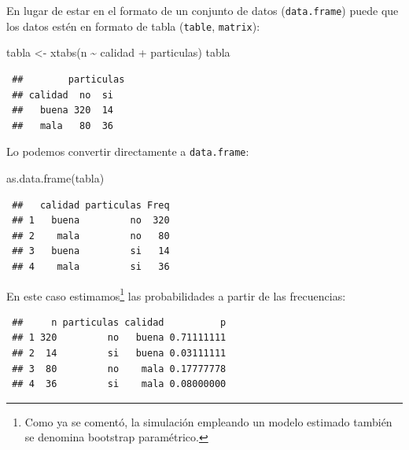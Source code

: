 \documentclass[
]{book}
\newenvironment{Shaded}{\begin{snugshade}}{\end{snugshade}}
\newcommand{\FunctionTok}[1]{\textcolor[rgb]{0.00,0.00,0.00}{#1}}
\newcommand{\NormalTok}[1]{#1}
\newcommand{\OtherTok}[1]{\textcolor[rgb]{0.56,0.35,0.01}{#1}}
\newcommand{\SpecialCharTok}[1]{\textcolor[rgb]{0.00,0.00,0.00}{#1}}
\theoremstyle{break}
\theoremstyle{nonumberplain}
\begin{document}
En lugar de estar en el formato de un conjunto de datos (\texttt{data.frame}) puede que los datos estén en formato de tabla (\texttt{table}, \texttt{matrix}):

\begin{Shaded}
\begin{Highlighting}[]
\NormalTok{tabla }\OtherTok{\textless{}{-}} \FunctionTok{xtabs}\NormalTok{(n }\SpecialCharTok{\textasciitilde{}}\NormalTok{ calidad }\SpecialCharTok{+}\NormalTok{ particulas)}
\NormalTok{tabla}
\end{Highlighting}
\end{Shaded}

\begin{verbatim}
 ##        particulas
 ## calidad  no  si
 ##   buena 320  14
 ##   mala   80  36
\end{verbatim}

Lo podemos convertir directamente a \texttt{data.frame}:

\begin{Shaded}
\begin{Highlighting}[]
\FunctionTok{as.data.frame}\NormalTok{(tabla)}
\end{Highlighting}
\end{Shaded}

\begin{verbatim}
 ##   calidad particulas Freq
 ## 1   buena         no  320
 ## 2    mala         no   80
 ## 3   buena         si   14
 ## 4    mala         si   36
\end{verbatim}

En este caso estimamos\footnote{Como ya se comentó, la simulación empleando un modelo estimado también se denomina bootstrap paramétrico.} las probabilidades a partir de las frecuencias:

\begin{Shaded}
\end{Shaded}

\begin{verbatim}
 ##     n particulas calidad          p
 ## 1 320         no   buena 0.71111111
 ## 2  14         si   buena 0.03111111
 ## 3  80         no    mala 0.17777778
 ## 4  36         si    mala 0.08000000
\end{verbatim}
\end{document}
